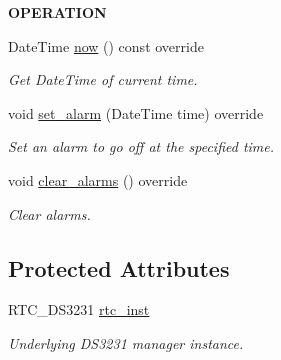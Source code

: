 \begin{Indent}{\bf O\+P\+E\+R\+A\+T\+I\+ON}\par
\begin{DoxyCompactItemize}
\item 
Date\+Time \hyperlink{class_loom___d_s3231_aae43c488ccea88b751d781a3dc920e0b}{now} () const override
\begin{DoxyCompactList}\small\item\em Get Date\+Time of current time. \end{DoxyCompactList}\item 
void \hyperlink{class_loom___d_s3231_a597444a8d1e4230ab931731986d9af7c}{set\+\_\+alarm} (Date\+Time time) override
\begin{DoxyCompactList}\small\item\em Set an alarm to go off at the specified time. \end{DoxyCompactList}\item 
void \hyperlink{class_loom___d_s3231_a013fba4d81a09ad61dabef8e2ffe9669}{clear\+\_\+alarms} () override
\begin{DoxyCompactList}\small\item\em Clear alarms. \end{DoxyCompactList}\end{DoxyCompactItemize}
\end{Indent}
\subsection*{Protected Attributes}
\begin{DoxyCompactItemize}
\item 
R\+T\+C\+\_\+\+D\+S3231 \hyperlink{class_loom___d_s3231_a3407d04f9e8cd13b2cfee640818f5e4b}{rtc\+\_\+inst}
\begin{DoxyCompactList}\small\item\em Underlying D\+S3231 manager instance. \end{DoxyCompactList}\end{DoxyCompactItemize}
